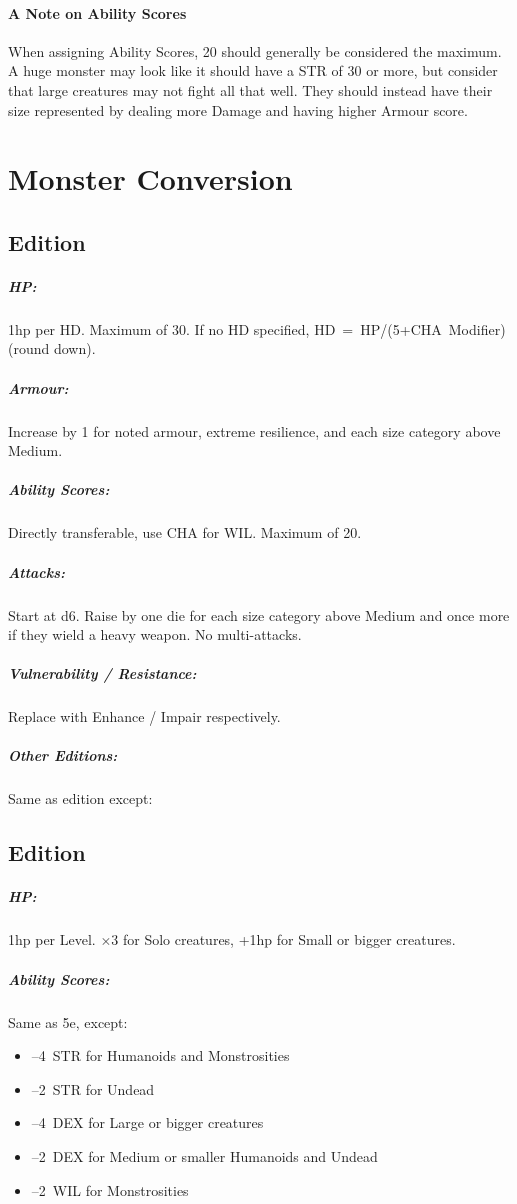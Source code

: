 \documentclass[itdr]{subfiles}
\begin{document}
\vfill
{}
\paragraph{A Note on Ability Scores}
When assigning Ability Scores, 20 should generally be considered the maximum. A huge monster may look like it should have a STR of 30 or more, but consider that large creatures may not fight all that well. They should instead have their size represented by dealing more Damage and having higher Armour score.

\vfill
\break

\section{Monster Conversion}

\subsection*{ Edition}

\subparagraph{HP:} 1hp per HD. Maximum of 30. If no HD specified, HD~=~HP/(5+CHA~Modifier) (round down).
\subparagraph{Armour:} Increase by 1 for noted armour, extreme resilience, and each size category above Medium.
\subparagraph{Ability Scores:} Directly transferable, use CHA for WIL. Maximum of 20.
\subparagraph{Attacks:} Start at d6. Raise by one die for each size category above Medium and once more if they wield a heavy weapon. No multi-attacks.
\subparagraph{Vulnerability / Resistance:} Replace with Enhance / Impair respectively.

\vfill

\subparagraph{Other Editions:} Same as  edition except:
\subsection*{ Edition}
\subparagraph{HP:} 1hp per Level. $\times$3 for Solo creatures, +1hp for Small or bigger creatures.
\subparagraph{Ability Scores:} Same as 5e, except:
\begin{itemize}
	\item --4~STR for Humanoids and Monstrosities
	\item --2~STR for Undead
	\item --4~DEX for Large or bigger creatures
	\item --2~DEX for Medium or smaller Humanoids and Undead
	\item --2~WIL for Monstrosities
\end{itemize}
\end{document}

